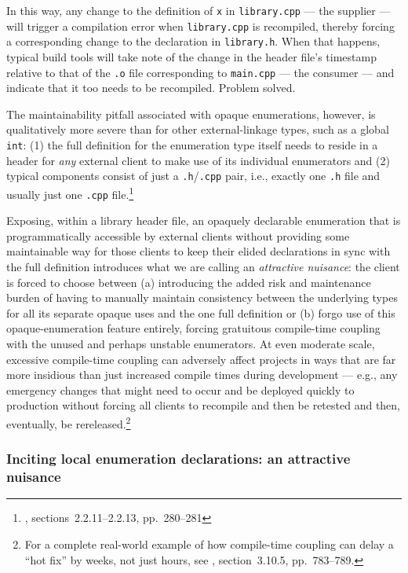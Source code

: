 \noindent In this way, any change to the definition of \lstinline!x! in
\lstinline!library.cpp! --- the supplier --- will trigger a compilation error
when \lstinline!library.cpp! is recompiled, thereby forcing a corresponding
change to the declaration in \lstinline!library.h!. When that happens,
typical build tools will take note of the change in the header file's
timestamp relative to that of the \lstinline!.o! file corresponding to
\lstinline!main.cpp! --- the consumer --- and indicate that it too needs to be
recompiled. Problem solved.

The maintainability pitfall associated with opaque enumerations,
however, is qualitatively more severe than for other external-linkage
types, such as a global \lstinline!int!: (1) the full definition for the
enumeration type itself needs to reside in a header for \emph{any}
external client to make use of its individual enumerators and (2)
typical components consist of just a \lstinline!.h!/\lstinline!.cpp! pair,
i.e., exactly one \lstinline!.h! file and usually just one \lstinline!.cpp!
file.{\cprotect\footnote{\cite{lakos20}, sections~2.2.11--2.2.13,
  pp.~280--281}}

Exposing, within a library header file, an opaquely declarable
enumeration that is programmatically accessible by external clients
without providing some maintainable way for those clients to keep their
elided declarations in sync with the full definition introduces what we
are calling an \emph{attractive nuisance}: the client is forced to
choose between (a) introducing the added risk and maintenance burden of
having to manually maintain consistency between the underlying types for
all its separate opaque uses and the one full definition or (b)
forgo use of this opaque-enumeration feature entirely, forcing
gratuitous compile-time coupling with
the unused and perhaps unstable enumerators. At even moderate scale, excessive
compile-time coupling can adversely affect projects in ways that are far
more insidious than just increased compile times during development ---
e.g., any emergency changes that might need to occur and be deployed
quickly to production without forcing all clients to recompile and then
be retested and then, eventually, be rereleased.\footnote{For a complete
real-world example of how compile-time coupling can delay a ``hot fix''
by weeks, not just hours, see \cite{lakos20}, section~3.10.5,
pp.~783--789.}

\subsubsection[Inciting local enumeration declarations: an attractive nuisance]{Inciting local enumeration declarations: an attractive nuisance}\label{inciting-local-enumeration-declarations-an-attractive-nuisance}

